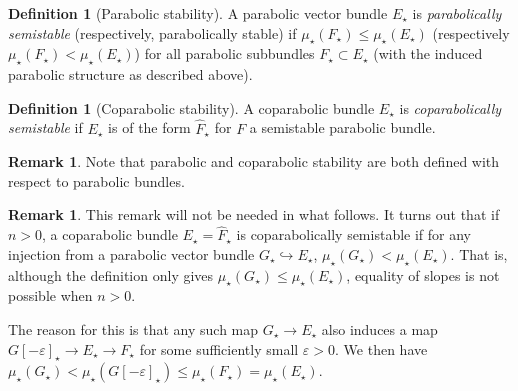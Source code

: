 \documentclass[12 pt]{amsart}
\theoremstyle{plain}
\theoremstyle{definition}
\newtheorem{definition}[subsubsection]{Definition}
\newtheorem{remark}[subsubsection]{Remark}
\theoremstyle{remark}
\numberwithin{equation}{section}
\begin{document}
\begin{definition}[Parabolic stability]
	\label{definition:}
	A parabolic vector bundle $E_\star$ is {\em parabolically semistable}
	(respectively, parabolically stable) if $\mu_\star(F_\star) \leq
\mu_\star(E_\star)$ (respectively $\mu_\star(F_\star)< \mu_\star(E_\star)$) for all parabolic subbundles $F_\star \subset E_\star$ (with the
induced parabolic structure as described above).
\end{definition}
\begin{definition}[Coparabolic stability]
	\label{definition:coparabolic-stability}
	A coparabolic bundle $E_\star$ is {\em coparabolically semistable}
	if $E_\star$ is of the form $\widehat{F}_\star$ for $F$ a semistable
	parabolic bundle.
\end{definition}
\begin{remark}
	\label{remark:}
	Note that parabolic and coparabolic stability are both defined with
	respect to parabolic bundles.
\end{remark}
\begin{remark}
	\label{remark:coparabolic-stability}
	This remark will not be needed in what follows.
	It turns out that if $n > 0$,
	a coparabolic bundle $E_\star=\widehat{F}_\star$ is coparabolically semistable if for any
	injection from a parabolic vector bundle $G_\star \hookrightarrow E_\star$, $\mu_\star(G_\star) <
	\mu_\star(E_\star)$.
	That is, although the definition 
	only gives $\mu_\star(G_\star) \leq \mu_\star(E_\star)$, equality of
	slopes is not possible when $n > 0$.

	The reason for this is that any such map $G_\star \to E_\star$ also
	induces a map $G[-\varepsilon]_\star \to E_\star\to F_\star$ for some sufficiently
	small $\varepsilon > 0$. 
	We then have $\mu_\star(G_\star) < \mu_\star(G[-\varepsilon]_\star) \leq
	\mu_\star(F_\star)=\mu_\star(E_\star)$.
\end{remark}
\end{document}
